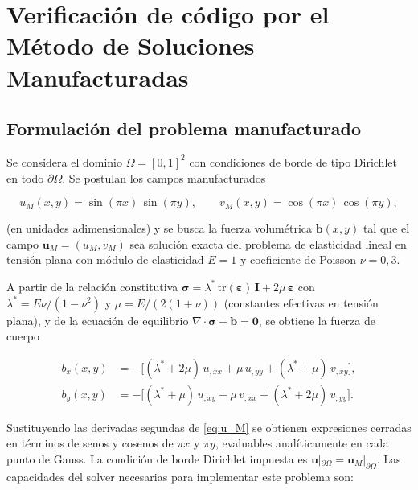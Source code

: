 \section{Verificación de código por el Método de Soluciones Manufacturadas}

\subsection{Formulación del problema manufacturado}

Se considera el dominio $\Omega = [0,1]^2$ con condiciones de borde de
tipo Dirichlet en todo $\partial\Omega$. Se postulan los campos manufacturados

\begin{equation}
  u_M(x,y) = \sin(\pi x)\,\sin(\pi y),
  \qquad
  v_M(x,y) = \cos(\pi x)\,\cos(\pi y),
  \label{eq:u_M}
\end{equation}

\noindent (en unidades adimensionales) y se busca la fuerza volumétrica
$\mathbf{b}(x,y)$ tal que el campo $\mathbf{u}_M = (u_M, v_M)$ sea solución
exacta del problema de elasticidad lineal en tensión plana con módulo de
elasticidad $E=1$ y coeficiente de Poisson $\nu=0{,}3$.

A partir de la relación constitutiva
$\boldsymbol{\sigma} = \lambda^*\, \mathrm{tr}(\boldsymbol{\varepsilon})\, \mathbf{I}
                       + 2\mu\,\boldsymbol{\varepsilon}$
con
$\lambda^* = E\nu / (1-\nu^2)$ y $\mu = E/(2(1+\nu))$ (constantes efectivas
en tensión plana), y de la ecuación de equilibrio
$\nabla\cdot\boldsymbol{\sigma} + \mathbf{b} = \mathbf{0}$, se obtiene la
fuerza de cuerpo

\begin{equation}
  \begin{aligned}
    b_x(x,y) &= -\bigl[(\lambda^* + 2\mu)\, u_{,xx} + \mu\, u_{,yy}
                       + (\lambda^* + \mu)\, v_{,xy}\bigr],\\
    b_y(x,y) &= -\bigl[(\lambda^* + \mu)\, u_{,xy} + \mu\, v_{,xx}
                       + (\lambda^* + 2\mu)\, v_{,yy}\bigr].
  \end{aligned}
  \label{eq:body_force}
\end{equation}

Sustituyendo las derivadas segundas de \eqref{eq:u_M} se obtienen expresiones
cerradas en términos de senos y cosenos de $\pi x$ y $\pi y$, evaluables
analíticamente en cada punto de Gauss. La condición de borde Dirichlet impuesta
es $\mathbf{u}|_{\partial\Omega} = \mathbf{u}_M|_{\partial\Omega}$. Las
capacidades del solver necesarias para implementar este problema son:

